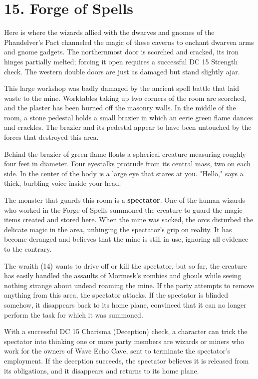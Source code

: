 \documentclass[10pt,a4paper,twoside,bg=print,twocolumn,openany,nodeprecatedcode]{dndbook}
\begin{document}
\section{15. Forge of Spells}
Here is where the wizards allied with the dwarves and gnomes of the Phandelver's Pact channeled the magic of these caverns to enchant dwarven arms and gnome gadgets. The northernmost door is scorched and cracked, its iron hinges partially melted; forcing it open requires a successful DC 15 Strength check. The western double doors are just as damaged but stand slightly ajar.

\begin{DndReadAloud}{}
This large workshop was badly damaged by the ancient spell battle that laid waste to the mine. Worktables taking up two corners of the room are scorched, and the plaster has been burned off the masonry walls. In the middle of the room, a stone pedestal holds a small brazier in which an eerie green flame dances and crackles. The brazier and its pedestal appear to have been untouched by the forces that destroyed this area.

Behind the brazier of green flame floats a spherical creature measuring roughly four feet in diameter. Four eyestalks protrude from its central mass, two on each side. In the center of the body is a large eye that stares at you. "Hello," says a thick, burbling voice inside your head.

\end{DndReadAloud}

The monster that guards this room is a \textbf{spectator}. One of the human wizards who worked in the Forge of Spells summoned the creature to guard the magic items created and stored here. When the mine was sacked, the orcs disturbed the delicate magic in the area, unhinging the spectator's grip on reality. It has become deranged and believes that the mine is still in use, ignoring all evidence to the contrary.

The wraith (14) wants to drive off or kill the spectator, but so far, the creature has easily handled the assaults of Mormesk's zombies and ghouls while seeing nothing strange about undead roaming the mine. If the party attempts to remove anything from this area, the spectator attacks. If the spectator is blinded somehow, it disappears back to its home plane, convinced that it can no longer perform the task for which it was summoned.

With a successful DC 15 Charisma (Deception) check, a character can trick the spectator into thinking one or more party members are wizards or miners who work for the owners of Wave Echo Cave, sent to terminate the spectator's employment. If the deception succeeds, the spectator believes it is released from its obligations, and it disappears and returns to its home plane.
\end{document}
